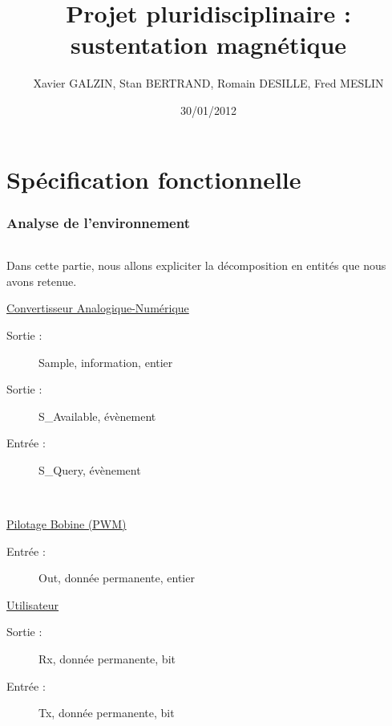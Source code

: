 \documentclass[11pt,french]{article} %
\title{Projet pluridisciplinaire : sustentation magnétique}
\author{ Xavier GALZIN, Stan BERTRAND, Romain DESILLE, Fred MESLIN}
\date{30/01/2012}
\begin{document}
\maketitle
\pagebreak


\part{Spécification fonctionnelle}

\section{Analyse de l'environnement}

\paragraph{} Dans cette partie, nous allons expliciter la décomposition en entités que nous avons retenue.
\vspace{0.2in}

\begin{minipage}[t]{9cm}
\hspace{0.2in}
\underline{Convertisseur Analogique-Numérique}
\begin{description}
\item[Sortie :] Sample, information, entier
\item[Sortie :] S\_Available, évènement
\item[Entrée :] S\_Query, évènement
\end{description}


\end{minipage}
~
\begin{minipage}[t]{8cm}
\hspace{0.2in}
\underline{Pilotage Bobine (PWM)}
\begin{description}
\item[Entrée : ] Out, donnée permanente, entier
\end{description}


\end{minipage}

\begin{minipage}[h]{20cm}
\hspace{0.2in}
\hspace{0.2in}
\underline{Utilisateur}   
\begin{description}
\item[Sortie : ] Rx, donnée permanente, bit
\item[Entrée : ] Tx, donnée permanente, bit
\end{description}


\end{minipage}
\end{document}
